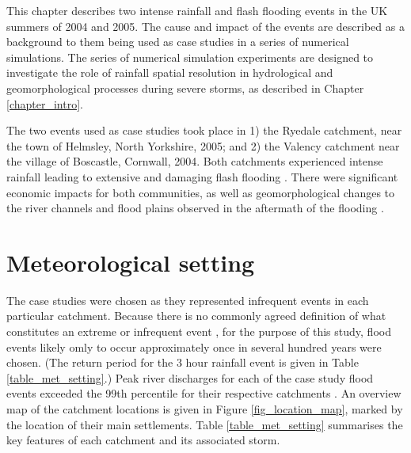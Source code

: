 This chapter describes two intense rainfall and flash flooding events in the UK summers of 2004 and 2005. The cause and impact of the events are described as a background to them being used as case studies in a series of numerical simulations. The series of numerical simulation experiments are designed to investigate the role of rainfall spatial resolution in hydrological and geomorphological processes during severe storms, as described in Chapter \ref{chapter_intro}. %

The two events used as case studies took place in 1) the Ryedale catchment, near the town of Helmsley, North Yorkshire, 2005; and  2) the Valency catchment near the village of Boscastle, Cornwall, 2004. Both catchments experienced intense rainfall leading to extensive and damaging flash flooding \citep{golding2005boscastle,sibley2009analysis}. There were significant economic impacts for both communities, as well as geomorphological changes to the river channels and flood plains observed in the aftermath of the flooding \citep{wallingford2005flooding,wass2008investigation}.

\section{Meteorological setting}
The case studies were chosen as they represented infrequent events in each particular catchment. Because there is no commonly agreed definition of what constitutes an extreme or infrequent event \citep[e.g.][]{wilby2008climate,fowler2010detecting,jones2014objective,}, for the purpose of this study, flood events likely omly to occur approximately once in several hundred years were chosen. (The return period for the 3 hour rainfall event is given in Table \ref{table_met_setting}.) Peak river discharges for each of the case study flood events exceeded the 99th percentile for their respective catchments \citep{hannaford2004development,NRFA}.  An overview map of the catchment locations is given in Figure \ref{fig_location_map}, marked by the location of their main settlements. Table \ref{table_met_setting} summarises the key features of each catchment and its associated storm.

